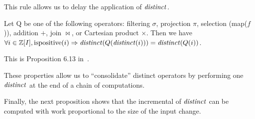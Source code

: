 This rule allows us to delay the application of $\mathit{distinct}$.

\begin{proposition}\label{prop-distinct-once}
Let Q be one of the following \zrs operators: filtering $\sigma$,
projection $\pi$, selection (map($f$)), addition $+$, join $\bowtie$, or
Cartesian product $\times$.
Then we have $\forall i \in \mathbb{Z}[I], \mbox{ispositive}(i) \Rightarrow \mathit{distinct}(Q(\mathit{distinct}(i))) = \mathit{distinct}(Q(i))$.
\end{proposition}

This is Proposition 6.13 in~\cite{green-tcs11}.

These properties allow us to ``consolidate'' distinct operators by performing
one $\mathit{distinct}$ at the end of a chain of computations.

Finally, the next proposition shows that the incremental of $\mathit{distinct}$
can be computed with work proportional to the size of the input change.

